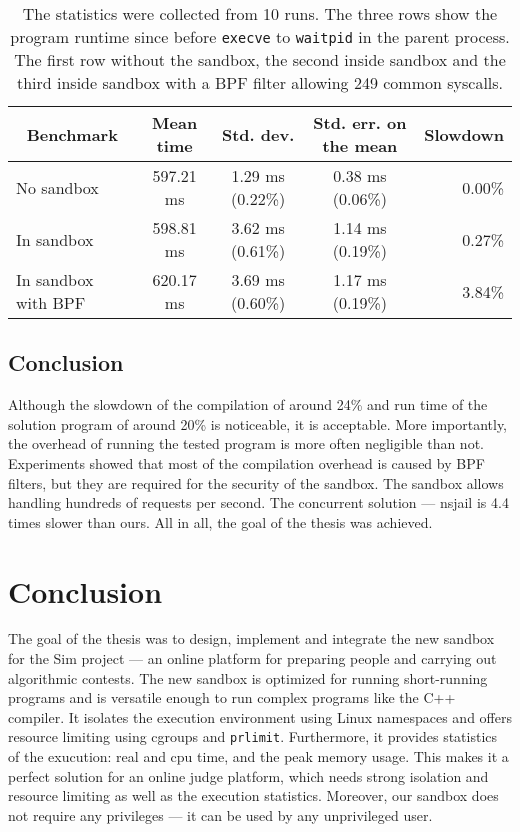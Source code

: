 \documentclass[en]{pracamgr}
\begin{document}
\begin{table}[h]
\centering
\begin{tabular}{|l|c|c|c|r|}
\hline
\multicolumn{1}{|c|}{Benchmark} & Mean time & Std. dev. & Std. err. on the mean & \multicolumn{1}{c|}{Slowdown} \\
\hline
No sandbox          & 597.21 ms & 1.29 ms (0.22\%) & 0.38 ms (0.06\%) & 0.00\% \\
In sandbox          & 598.81 ms & 3.62 ms (0.61\%) & 1.14 ms (0.19\%) & 0.27\% \\
In sandbox with BPF & 620.17 ms & 3.69 ms (0.60\%) & 1.17 ms (0.19\%) & 3.84\% \\
\hline
\end{tabular}
\caption{The statistics were collected from 10 runs. The three rows show the program runtime since before \texttt{execve} to \texttt{waitpid} in the parent process. The first row without the sandbox, the second inside sandbox and the third inside sandbox with a BPF filter allowing 249 common syscalls.}
\label{table:million_lseek}
\end{table}

\fi

\section{Conclusion}

Although the slowdown of the compilation of around 24\% and run time of the solution program of around 20\% is noticeable, it is acceptable. More importantly, the overhead of running the tested program is more often negligible than not. Experiments showed that most of the compilation overhead is caused by BPF filters, but they are required for the security of the sandbox. The sandbox allows handling hundreds of requests per second. The concurrent solution --- nsjail is 4.4 times slower than ours. All in all, the goal of the thesis was achieved.

\chapter{Conclusion}\label{chapter:conclusion}

The goal of the thesis was to design, implement and integrate the new sandbox for the Sim project \cite{sim_project} --- an online platform for preparing people and carrying out algorithmic contests. The new sandbox is optimized for running short-running programs and is versatile enough to run complex programs like the C++ compiler. It isolates the execution environment using Linux namespaces and offers resource limiting using cgroups and \texttt{prlimit}. Furthermore, it provides statistics of the exucution: real and cpu time, and the peak memory usage. This makes it a perfect solution for an online judge platform, which needs strong isolation and resource limiting as well as the execution statistics. Moreover, our sandbox does not require any privileges --- it can be used by any unprivileged user.
\end{document}
